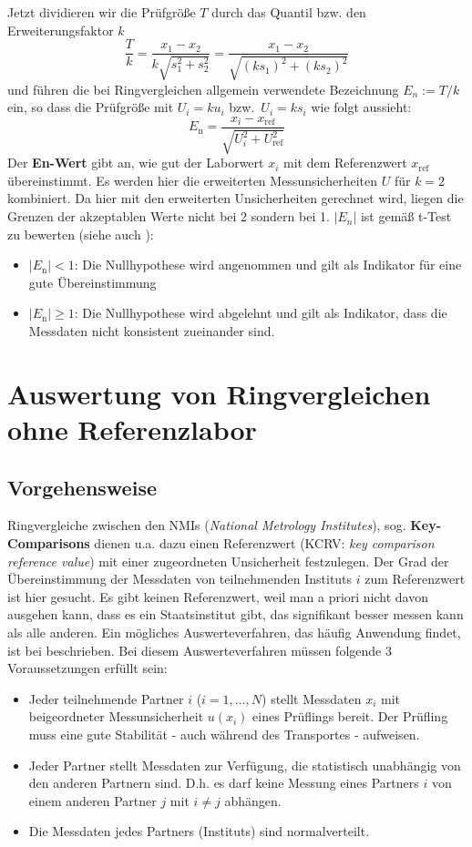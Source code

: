 Jetzt dividieren wir die Prüfgröße $T$ durch das Quantil bzw. den Erweiterungsfaktor $k$
$$
\frac{T}{k} = \frac{x_1 - x_2}{k \sqrt{s_1^2 + s_2^2}}  = \frac{x_1 - x_2}
{\sqrt{(k s_1)^2 + (k s_2)^2}}
$$
und führen die bei Ringvergleichen allgemein verwendete Bezeichnung $E_n := T /k$ ein,
so dass die Prüfgröße mit $U_i = k u_i$ bzw.\  $U_i = k s_i$ wie folgt aussieht:
\begin{equation}
E_\mathrm{n} = \frac{x_{i}- x_\mathrm{ref}}{\sqrt{U_{i}^2+U_\mathrm{ref}^2}}
\label{eq:EnWert}
\end{equation}
Der \textbf{En-Wert} gibt an, wie gut der Laborwert $x_{i}$ mit dem
Referenzwert $x_\mathrm{ref}$ übereinstimmt. Es werden hier die erweiterten Messunsicherheiten $U$ für $k=2$ kombiniert.
Da hier mit den erweiterten Unsicherheiten gerechnet wird, liegen die Grenzen der akzeptablen Werte nicht bei 2 sondern bei 1.
$|E_n|$ ist gemäß t-Test zu bewerten (siehe auch \cite{ISO13528}):
\begin{itemize}
	\item $|E_\mathrm{n}| < 1$: Die Nullhypothese wird angenommen und gilt als Indikator für eine gute Übereinstimmung
	\item $|E_\mathrm{n}| \ge 1$: Die Nullhypothese wird abgelehnt und gilt als Indikator, dass die Messdaten nicht konsistent zueinander sind.
\end{itemize}

\section{Auswertung von Ringvergleichen ohne Referenzlabor}
\subsection{Vorgehensweise}
Ringvergleiche zwischen den NMIs (\textsl{National Metrology Institutes}), sog.
\textbf{Key-Com\-pari\-sons} dienen u.a. dazu einen Referenzwert (KCRV: \textsl{key comparison reference
value}) mit einer zugeordneten Unsicherheit festzulegen.
Der Grad der Übereinstimmung der Messdaten von teilnehmenden Instituts $i$ zum Referenzwert ist hier gesucht. Es gibt keinen Referenzwert, weil man a priori nicht davon ausgehen kann, dass es ein Staatsinstitut gibt, das signifikant besser messen kann als alle anderen.
Ein mögliches Auswerteverfahren, das häufig Anwendung findet, ist bei
\cite{Cox02} beschrieben. Bei diesem Auswerteverfahren müssen
folgende 3 Voraussetzungen erfüllt sein:
\begin{itemize}
	\item Jeder teilnehmende Partner $i$ ($i=1, \dots, N$) stellt Messdaten $x_i$ mit
	beigeordneter Messunsicherheit $u(x_i)$ eines Prüflings bereit. Der
	Prüfling muss eine gute Stabilität - auch während des Transportes -
	aufweisen.
	\item Jeder Partner stellt Messdaten zur Verfügung, die
	statistisch unabhängig von den anderen Partnern sind. D.h. es darf keine
	Messung eines Partners $i$ von einem anderen Partner $j$ mit $i \ne j$ abhängen.
	\item Die Messdaten jedes Partners (Instituts) sind normalverteilt.
\end{itemize}

